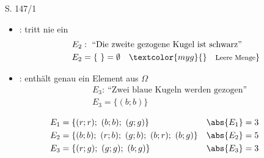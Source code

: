 \begin{Exercise}{S. 147/1}{}
\begin{enumerate}[leftmargin=*]
{\begin{enumerate}[label=\alph*),leftmargin=*]
{\begin{itemize}[leftmargin=*]
{\begin{align*}
                        &E_{1} = \Omega
                    \end{align*}
                    }
                \item {
                    : tritt nie ein
                    \begin{align*}
                        &E_{2}: \ \text{``Die zweite gezogene Kugel ist schwarz''}\\
                        &E_{2} = \{ \ \} = \emptyset \quad \textcolor{myg}{\text{\}\quad \footnotesize Leere Menge}}
                    \end{align*}
                    }
                \item {
                    : enthält genau ein Element aus $\Omega$
                    \begin{align*}
                        &E_{3}: \ \text{``Zwei blaue Kugeln werden gezogen''}\\
                        &E_{3} = \{ (b; b) \}
                    \end{align*}
                    }
            \end{itemize}
            \begin{align*}
                E_{1} &= \{ (r; r); \ (b; b); \ (g; g) \} & \abs{E_{1}} = 3 &&\\
                E_{2} &= \{ (b; b); \ (r; b); \ (g; b); \ (b; r); \ (b; g) \} & \abs{E_{2}} = 5 &&\\
                E_{3} &= \{ (r; g); \ (g; g); \ (b; g) \} & \abs{E_{3}} = 3 &&
            \end{align*}
            }
    \end{enumerate}
    }
\end{enumerate}
\end{Exercise}

